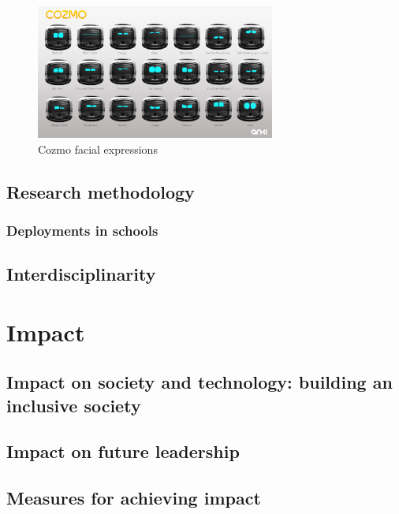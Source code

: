 \documentclass[11pt]{article}
\begin{document}
\begin{figure}[!htbp]
\centering
    \includegraphics[width=0.7\textwidth]{figs/cozmo-expression-sheet.jpg}
\caption{Cozmo facial expressions}
\end{figure}


\subsection{Research methodology}\label{research-methodology}


\subsubsection{Deployments in schools}

\subsection{Interdisciplinarity}

\newpage
\section{Impact}\label{impact}

\subsection{Impact on society and technology: building an inclusive society}

\subsection{Impact on future leadership}

\subsection{Measures for achieving impact}
\end{document}
